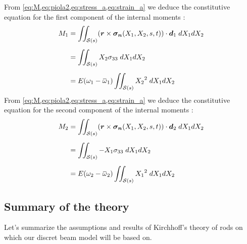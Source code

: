 From \cref{eq:M,eq:piola2,eq:stress_a,eq:strain_a} we deduce the constitutive equation for the first component of the internal moments : 
\begin{equation}
	\begin{aligned}
		M_1 &= \iint_{\mathcal{S}(s)} (\vect{r} \times \vect{\sigma_n}(X_1, X_2, s, t)) \cdot \vect{d}_1 \;dX_1 dX_2
		\\[0.5em]
		&= \iint_{\mathcal{S}(s)} X_2\sigma_{33} \;dX_1 dX_2 
		\\[0.5em]
		&= E (\omega_1 - \overbar{\omega}_1) \iint_{\mathcal{S}(s)} {X_2}^2  \;dX_1 dX_2 
	\end{aligned}
\end{equation}
From \cref{eq:M,eq:piola2,eq:stress_a,eq:strain_a} we deduce the constitutive equation for the second component of the internal moments : 
\begin{equation}
	\begin{aligned}
		M_2 &= \iint_{\mathcal{S}(s)} (\vect{r} \times \vect{\sigma_n}(X_1, X_2, s, t)) \cdot \vect{d}_2 \;dX_1 dX_2
		\\[0.5em]
		&= \iint_{\mathcal{S}(s)} - X_1\sigma_{33} \;dX_1 dX_2 
		\\[0.5em]
		&= E (\omega_2 - \overbar{\omega}_2) \iint_{\mathcal{S}(s)} {X_1}^2  \;dX_1 dX_2 
	\end{aligned}
\end{equation}

\clearpage
\subsection{Summary of the theory}
Let's summarize the assumptions and results of Kirchhoff's theory of rods on which our discret beam model will be based on.

